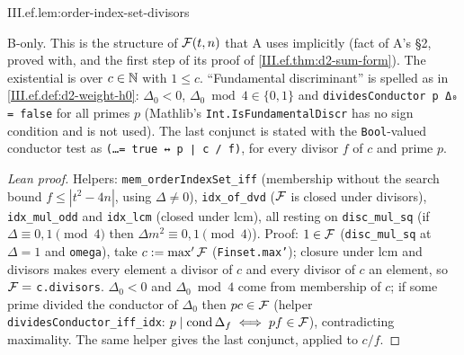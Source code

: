 \begin{lemma}
\bonly
{}
\end{lemma}
\begin{tfformal}{III.ef.lem:order-index-set-divisors}
\begin{tffidelity}
B-only. This is the structure of $\mathcal{F}(t,n)$ that A uses implicitly (fact of A's \S2, proved with, and the first step of its proof of \cref{III.ef.thm:d2-sum-form}). The existential is over $c\in\mathbb{N}$ with $1\le c$. ``Fundamental discriminant'' is spelled as in \cref{III.ef.def:d2-weight-h0}: $\Delta_0<0$, $\Delta_0\bmod4\in\{0,1\}$ and \texttt{dividesConductor p Δ₀ = false} for all primes $p$ (Mathlib's \texttt{Int.IsFundamentalDiscr} has no sign condition and is not used). The last conjunct is stated with the \texttt{Bool}-valued conductor test as \texttt{(\dots = true ↔ p ∣ c / f)}, for every divisor $f$ of $c$ and prime $p$.
\end{tffidelity}
\end{tfformal}
\begin{proof}[Lean proof]
Helpers: \texttt{mem\_orderIndexSet\_iff} (membership without the search bound $f\le|t^2-4n|$, using $\Delta\ne0$), \texttt{idx\_of\_dvd} ($\mathcal{F}$ is closed under divisors), \texttt{idx\_mul\_odd} and \texttt{idx\_lcm} (closed under lcm), all resting on \texttt{disc\_mul\_sq} (if $\Delta\equiv0,1\pmod4$ then $\Delta m^2\equiv0,1\pmod4$). Proof: $1\in\mathcal{F}$ (\texttt{disc\_mul\_sq} at $\Delta=1$ and \texttt{omega}), take $c:=\max'\mathcal{F}$ (\texttt{Finset.max'}); closure under lcm and divisors makes every element a divisor of $c$ and every divisor of $c$ an element, so $\mathcal{F}=$ \texttt{c.divisors}. $\Delta_0<0$ and $\Delta_0\bmod4$ come from membership of $c$; if some prime divided the conductor of $\Delta_0$ then $pc\in\mathcal{F}$ (helper \texttt{dividesConductor\_iff\_idx}: $p\mid\mathrm{cond}\,\Delta_f\iff pf\in\mathcal{F}$), contradicting maximality. The same helper gives the last conjunct, applied to $c/f$.
\end{proof}

